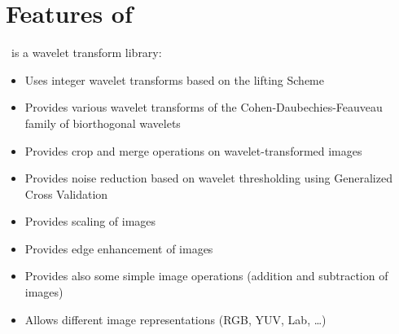 %
%
% 
% 
% 
% 
%

\section{Features of \libname}

\libname\ is a wavelet transform library:
\begin{itemize}
\item Uses integer wavelet transforms based on the lifting Scheme
\item Provides various wavelet transforms of the Cohen-Daubechies-Feauveau
family of biorthogonal wavelets
\item Provides crop and merge operations on wavelet-transformed images
\item Provides noise reduction based on wavelet thresholding using Generalized
Cross Validation
\item Provides scaling of images
\item Provides edge enhancement of images
\item Provides also some simple image operations (addition and subtraction of images)
\item Allows different image representations (RGB, YUV, Lab, \ldots )
\end{itemize}

